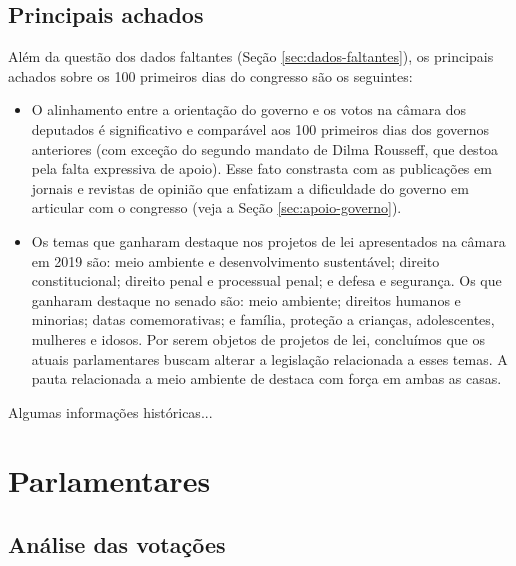 \documentclass[12pt,a4paper]{article}
\newcommand{\HX}[1]{{\centering\color{red}\large<#1>}}
\begin{document}
\subsection{Principais achados}

Além da questão dos dados faltantes (Seção \ref{sec:dados-faltantes}), os principais achados
sobre os 100 primeiros dias do congresso são os seguintes:

\begin{itemize}

\item O alinhamento entre a orientação do governo e os votos na câmara dos deputados é significativo e
  comparável aos 100 primeiros dias dos governos anteriores (com exceção do segundo mandato de Dilma Rousseff,
  que destoa pela falta expressiva de apoio). Esse fato constrasta com as publicações em jornais e revistas
  de opinião que enfatizam a dificuldade do governo em articular com o congresso (veja a Seção \ref{sec:apoio-governo}).

\item Os temas que ganharam destaque nos projetos de lei apresentados na câmara em 2019 são: meio ambiente e desenvolvimento
  sustentável; direito constitucional; direito penal e processual penal; e defesa e segurança. Os que ganharam
  destaque no senado são: meio ambiente; direitos humanos e minorias; datas comemorativas; e família, proteção a crianças,
  adolescentes, mulheres e idosos. Por serem objetos de projetos de lei, concluímos que os atuais parlamentares
  buscam alterar a legislação relacionada a esses temas. A pauta relacionada a meio ambiente de destaca com força
  em ambas as casas.

\end{itemize}


Algumas informações históricas...



\HX{Incluir tabela com dados disponíveis e não disponíveis em 2019}
\HX{Incluit tabela com análises com câmara e senado}

\section{Parlamentares}


\subsection{Análise das votações}
\end{document}
